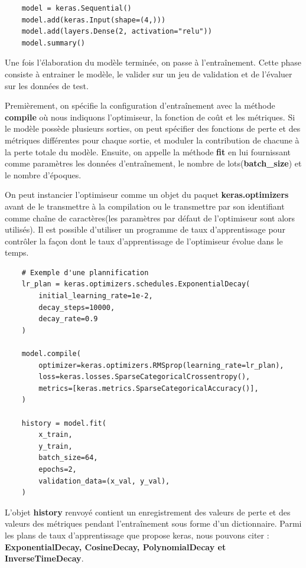 \documentclass[a4paper,12pt,twoside]{report}
\theoremstyle{definition}
\theoremstyle{plain}
\theoremstyle{remark}
\begin{document}
\begin{lstlisting}
	model = keras.Sequential()
	model.add(keras.Input(shape=(4,)))
	model.add(layers.Dense(2, activation="relu"))
	model.summary()
\end{lstlisting}

Une fois l'élaboration du modèle terminée, on passe à l'entraînement. Cette phase consiste à entrainer le modèle, le valider sur un jeu de validation et de l'évaluer sur les données de test.

Premièrement, on spécifie la configuration d'entraînement avec la méthode \textbf{compile} où nous indiquons l'optimiseur, la fonction de coût et  les métriques. Si le modèle possède plusieurs sorties, on peut spécifier des fonctions de perte et des métriques différentes pour chaque sortie, et moduler la contribution de chacune à la perte totale du modèle. Ensuite, on appelle la méthode \textbf{fit} en lui fournissant comme paramètres les données d'entraînement, le nombre de lots(\textbf{batch\_size}) et le nombre d'époques.

On peut instancier l'optimiseur comme un objet du paquet \textbf{keras.optimizers} avant de le transmettre à la compilation ou le transmettre par son identifiant comme chaîne de caractères(les paramètres par défaut de l'optimiseur sont alors utilisés). Il est possible d'utiliser un programme de taux d'apprentissage pour contrôler la façon dont le taux d'apprentissage de l'optimiseur évolue dans le temps.

\begin{lstlisting}
	# Exemple d'une plannification
	lr_plan = keras.optimizers.schedules.ExponentialDecay(
	    initial_learning_rate=1e-2,
		decay_steps=10000,
		decay_rate=0.9
	)
	
	model.compile(
		optimizer=keras.optimizers.RMSprop(learning_rate=lr_plan),
		loss=keras.losses.SparseCategoricalCrossentropy(),
		metrics=[keras.metrics.SparseCategoricalAccuracy()],
	)
	
	history = model.fit(
		x_train,
		y_train,
		batch_size=64,
		epochs=2,
		validation_data=(x_val, y_val),
	)
\end{lstlisting}

L'objet \textbf{history} renvoyé contient un enregistrement des valeurs de perte et des valeurs des métriques pendant l'entraînement sous forme d'un dictionnaire.
Parmi les plans de taux d'apprentissage que propose keras, nous pouvons citer : \textbf{ExponentialDecay, CosineDecay, PolynomialDecay et InverseTimeDecay}.
\end{document}
